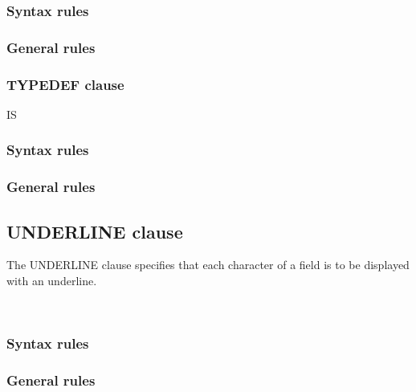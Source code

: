 \subsubsection{Syntax rules}

\subsubsection{General rules}

\subsubsection{TYPEDEF clause}

\begin{syntax}
  IS 
\end{syntax}

\subsubsection{Syntax rules}

\subsubsection{General rules}

\subsection{UNDERLINE clause}

The UNDERLINE clause specifies that each character of a field is to be displayed with an underline.

\begin{syntax}
  \begin{1=}
     \\
  \end{1=}
\end{syntax}

\subsubsection{Syntax rules}

\subsubsection{General rules}

